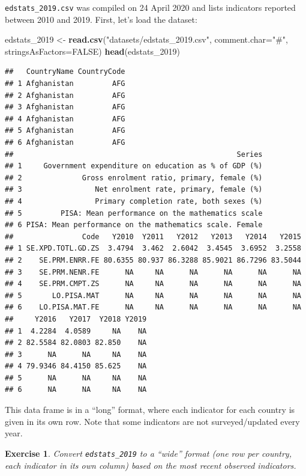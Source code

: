 \documentclass[10pt,b5paper,krantz1]{krantz}
\newenvironment{Shaded}{\begin{snugshade}}{\end{snugshade}}
\newcommand{\DataTypeTok}[1]{\textcolor[rgb]{0.27,0.27,0.27}{#1}}
\newcommand{\DecValTok}[1]{\textcolor[rgb]{0.06,0.06,0.06}{#1}}
\newcommand{\KeywordTok}[1]{\textcolor[rgb]{0.27,0.27,0.27}{\textbf{#1}}}
\newcommand{\NormalTok}[1]{#1}
\newcommand{\OtherTok}[1]{\textcolor[rgb]{0.37,0.37,0.37}{#1}}
\newcommand{\StringTok}[1]{\textcolor[rgb]{0.5,0.5,0.5}{#1}}
\newtheorem{exercise}{Exercise}[chapter]
\begin{document}
\texttt{edstats\_2019.csv} was compiled on 24 April 2020 and lists
indicators reported between 2010 and 2019.
First, let's load the dataset:

\begin{Shaded}
\begin{Highlighting}[]
\NormalTok{edstats_}\DecValTok{2019}\NormalTok{ <-}\StringTok{ }\KeywordTok{read.csv}\NormalTok{(}\StringTok{"datasets/edstats_2019.csv"}\NormalTok{,}
    \DataTypeTok{comment.char=}\StringTok{"#"}\NormalTok{, }\DataTypeTok{stringsAsFactors=}\OtherTok{FALSE}\NormalTok{)}
\KeywordTok{head}\NormalTok{(edstats_}\DecValTok{2019}\NormalTok{)}
\end{Highlighting}
\end{Shaded}

\begin{verbatim}
##   CountryName CountryCode
## 1 Afghanistan         AFG
## 2 Afghanistan         AFG
## 3 Afghanistan         AFG
## 4 Afghanistan         AFG
## 5 Afghanistan         AFG
## 6 Afghanistan         AFG
##                                                    Series
## 1     Government expenditure on education as % of GDP (%)
## 2              Gross enrolment ratio, primary, female (%)
## 3                 Net enrolment rate, primary, female (%)
## 4                 Primary completion rate, both sexes (%)
## 5         PISA: Mean performance on the mathematics scale
## 6 PISA: Mean performance on the mathematics scale. Female
##                Code   Y2010  Y2011   Y2012   Y2013   Y2014   Y2015
## 1 SE.XPD.TOTL.GD.ZS  3.4794  3.462  2.6042  3.4545  3.6952  3.2558
## 2    SE.PRM.ENRR.FE 80.6355 80.937 86.3288 85.9021 86.7296 83.5044
## 3    SE.PRM.NENR.FE      NA     NA      NA      NA      NA      NA
## 4    SE.PRM.CMPT.ZS      NA     NA      NA      NA      NA      NA
## 5       LO.PISA.MAT      NA     NA      NA      NA      NA      NA
## 6    LO.PISA.MAT.FE      NA     NA      NA      NA      NA      NA
##     Y2016   Y2017  Y2018 Y2019
## 1  4.2284  4.0589     NA    NA
## 2 82.5584 82.0803 82.850    NA
## 3      NA      NA     NA    NA
## 4 79.9346 84.4150 85.625    NA
## 5      NA      NA     NA    NA
## 6      NA      NA     NA    NA
\end{verbatim}

This data frame is in a ``long'' format, where each indicator
for each country is given in its own row. Note that some indicators
are not surveyed/updated every year.

\begin{exercise}

Convert \texttt{edstats\_2019} to a ``wide'' format (one row per country,
each indicator in its own column) based on the most recent observed indicators.

\end{exercise}
\end{document}
